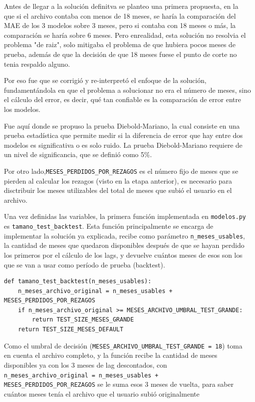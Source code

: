 Antes de llegar a la solución definitva se planteo una primera propuesta, en la que si el archivo contaba con menos de 18 meses, se haría la comparación del MAE de los 3 modelos sobre 3 meses, pero si contaba con 18 meses o más, la comparación se haría sobre 6 meses. Pero enrealidad, esta solución no resolvia el problema "de raiz", solo mitigaba el problema de que hubiera pocos meses de prueba, además de que la decisión de que 18 meses fuese el punto de corte no tenia respaldo alguno.

Por eso fue que se corrigió y re-interpretó el enfoque de la solución, fundamentándola en que el problema a solucionar no era el número de meses, sino el cálculo del error, es decir, qué tan confiable es la comparación de error entre los modelos.

Fue aquí donde se propuso la prueba Diebold-Mariano, la cual consiste en una prueba estadística que permite medir si la diferencia de error que hay entre dos modelos es significativa o es solo ruido. La prueba Diebold-Mariano requiere de un nivel de significancia, que se definió como 5\%.

Por otro lado,\texttt{MESES\_PERDIDOS\_POR\_REZAGOS} es el número fijo de meses que se pierden al calcular los rezagos (visto en la etapa anterior), es necesario para disctribuir los meses utilizables del total de meses que subió el usuario en el archivo.

Una vez definidas las variables, la primera función implementada en \texttt{modelos.py} es \texttt{tamano\_test\_backtest}. Esta función principalmente se encarga de implementar la solución ya explicada, recibe como parámetro \texttt{n\_meses\_usables}, la cantidad de meses que quedaron disponibles después de que se hayan perdido los primeros por el cálculo de los lags, y devuelve cuántos meses de esos son los que se van a usar como período de prueba (backtest).

\label{lst:tamano_test_modelos}
\begin{verbatim}
def tamano_test_backtest(n_meses_usables):
    n_meses_archivo_original = n_meses_usables + MESES_PERDIDOS_POR_REZAGOS
    if n_meses_archivo_original >= MESES_ARCHIVO_UMBRAL_TEST_GRANDE:
        return TEST_SIZE_MESES_GRANDE
    return TEST_SIZE_MESES_DEFAULT
\end{verbatim}

Como el umbral de decisión (\texttt{MESES\_ARCHIVO\_UMBRAL\_TEST\_GRANDE = 18}) toma en cuenta el archivo completo, y la función recibe la cantidad de meses disponibles ya con los 3 meses de lag descontados, con \texttt{n\_meses\_archivo\_original = n\_meses\_usables + MESES\_PERDIDOS\_POR\_REZAGOS} se le suma esos 3 meses de vuelta, para saber cuántos meses tenía el archivo que el usuario subió originalmente

